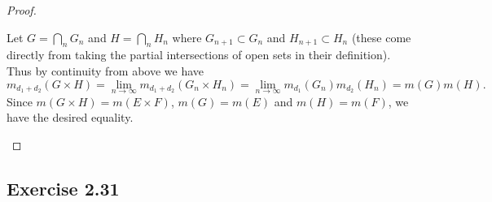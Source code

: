 \documentclass[hw_all.tex]{subfiles}
\begin{document}
\begin{proof}
\begin{enumerate}
            Let $G = \bigcap_{n} G_n$ and $H = \bigcap_{n} H_n$ where $G_{n+1} \subset G_n$ and $H_{n+1} \subset H_n$ (these come directly from taking the partial intersections of open sets in their definition). Thus by continuity from above we have
            \[
                m_{d_1+d_2}(G \times H) = \lim_{n \to \infty} m_{d_1+d_2}(G_n \times H_n) = \lim_{n \to \infty} m_{d_1}(G_n) m_{d_2}(H_n) = m(G) m(H)
            .\]
            Since $m(G \times H) = m(E \times F)$, $m(G) = m(E)$ and $m(H) = m(F)$, we have the desired equality.
    \end{enumerate}
\end{proof}

\subsection{Exercise 2.31}
\end{document}

